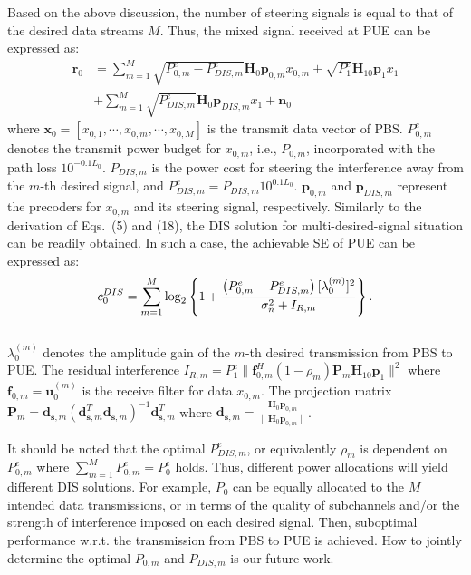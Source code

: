 \documentclass[10pt, conference, letterpaper]{IEEEtran}
\begin{document}
Based on the above discussion,
the number of steering signals is equal to that of the desired data streams $M$.
Thus, the mixed signal received at PUE can be expressed as:
\vspace*{-0.1in}
\begin{equation}
\begin{aligned}
\mathbf{r}_{0}&=\sum^{M}_{m=1}\sqrt{P^{e}_{0,m}-P^{e}_{DIS,m}}\mathbf{H}_{0}\mathbf{p}_{0,m}x_{0,m}
+\sqrt{P^{e}_{1}}\mathbf{H}_{10}\mathbf{p}_{1}x_{1}\\
&+\sum^{M}_{m=1}\sqrt{P^{e}_{DIS,m}}\mathbf{H}_{0}\mathbf{p}_{DIS,m}x_{1}+\mathbf{n}_{0}
\end{aligned}
\end{equation}
where $\mathbf{x}_{0}=[x_{0,1},\cdots,x_{0,m},\cdots,x_{0,M}]$ is the transmit data vector of PBS.
$P^{e}_{0,m}$ denotes the transmit power budget for $x_{0,m}$, i.e., $P_{0,m}$,
incorporated with the path loss $10^{-0.1L_{0}}$.
$P_{DIS,m}$ is the power cost for steering the interference
away from the $m$-th desired signal, and $P^{e}_{DIS,m}=P_{DIS,m}10^{0.1L_{0}}$.
$\mathbf{p}_{0,m}$ and $\mathbf{p}_{DIS,m}$ represent the precoders for
$x_{0,m}$ and its steering signal, respectively.
Similarly to the derivation of Eqs.~(5) and (18), the
DIS solution for multi-desired-signal situation can be readily obtained.
In such a case, the achievable SE of PUE can be expressed as:
\begin{equation}
c^{DIS}_{0}=\sum^{M}_{m=1}\log_{2}\left\{
1+\frac{\left(P^{e}_{0,m}-P^{e}_{DIS,m}\right)[\lambda^{(m)}_{0}]^{2}}{\sigma^{2}_{n}+I_{R,m}}
\right\}.
\vspace*{-0.05in}
\end{equation}
\\
$\lambda^{(m)}_{0}$ denotes the amplitude gain of the $m$-th desired transmission from PBS to PUE.
The residual interference $I_{R,m}=P^{e}_{1}\|\mathbf{f}^{H}_{0,m}(1-\rho_{m})\mathbf{P}_{m}\mathbf{H}_{10}
\mathbf{p}_{1}\|^{2}$
where $\mathbf{f}_{0,m}=\mathbf{u}^{(m)}_{0}$ is the receive filter for data $x_{0,m}$.
The projection matrix
$\mathbf{P}_{m}=\mathbf{d}_{\mathbf{s},m}(\mathbf{d}^{T}_{\mathbf{s},m}\mathbf{d}_{\mathbf{s},m})^{-1}
\mathbf{d}^{T}_{\mathbf{s},m}$
where $\mathbf{d}_{\mathbf{s},m}=\frac{\mathbf{H}_{0}\mathbf{p}_{0,m}}{\|\mathbf{H}_{0}\mathbf{p}_{0,m}\|}$.

It should be noted that the optimal $P^{e}_{DIS,m}$, or equivalently $\rho_{m}$ is dependent on $P^{e}_{0,m}$
where $\sum^{M}_{m=1}P^{e}_{0,m}=P^{e}_{0}$ holds.
Thus, different power allocations will yield different DIS solutions.
For example, $P_{0}$ can be equally allocated to the $M$ intended data transmissions,
or in terms of the quality of subchannels and/or
the strength of interference imposed on each desired signal.
Then, suboptimal performance w.r.t. the transmission from PBS to PUE is achieved.
How to jointly determine the optimal $P_{0,m}$ and $P_{DIS,m}$ is our future work.
\end{document}
